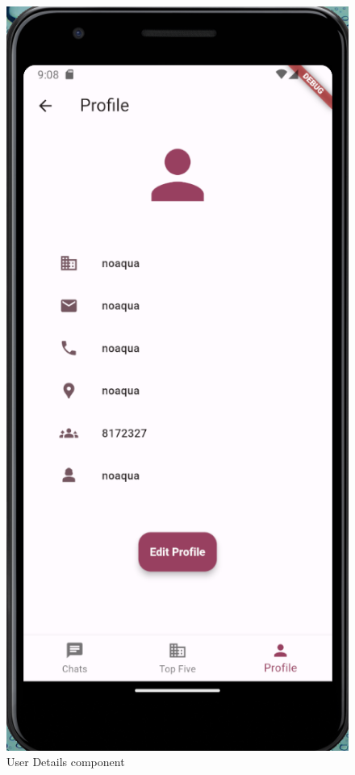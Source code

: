 \begin{figure}[htbp]
    \centering
    \includegraphics[scale=0.4]{pictures/because_it_looks_bad_we_have_ui.png}
    \caption{User Details component}
    \label{userDetailsComponent}
\end{figure}

\label{implementation}

